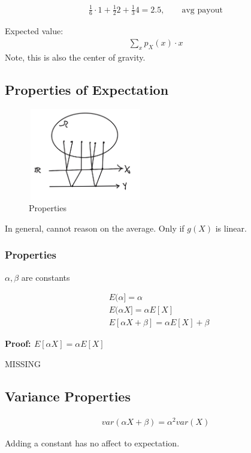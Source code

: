 \begin{align*}
\frac{1}{6}\cdot 1 + \frac{1}{2}2 + \frac{1}{3}4 = 2.5, \qquad \text{avg payout}
\end{align*}

Expected value:
\begin{align*}
\sum_x p_X(x) \cdot x
\end{align*}
Note, this is also the center of gravity.

\subsection{Properties of Expectation}


\begin{figure}[h]
\centering
\includegraphics[width=5cm, height=4cm]{images/L05/EX_properties.jpeg}
\caption{Properties}
\end{figure}

 In general, cannot reason on the average.  Only if $g(X)$ is linear.


\subsubsection{Properties}
$\alpha, \beta$ are constants

\begin{align}
&E(\alpha] = \alpha\\
&E(\alpha X] = \alpha E[X]\\
&E[\alpha X + \beta] = \alpha E[X] + \beta
\end{align}

\textbf{Proof: $E[\alpha X]= \alpha E[X]$}

MISSING

\subsection{Variance Properties}


\begin{align}
var(\alpha X + \beta) = \alpha^2 var(X)
\end{align}

Adding a constant has no affect to expectation.